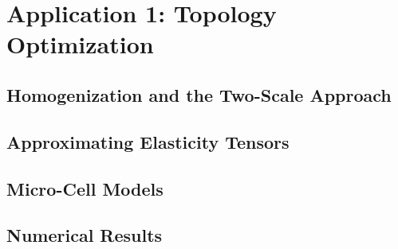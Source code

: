 
\chapter{Application 1: Topology Optimization}


\section{Homogenization and the Two-Scale Approach}


\section{Approximating Elasticity Tensors}


\section{Micro-Cell Models}


\section{Numerical Results}

